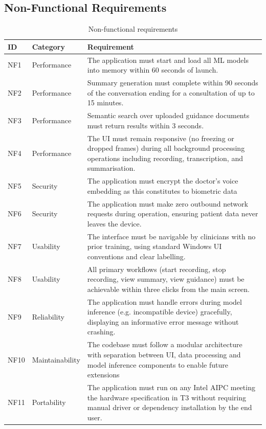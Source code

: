 \subsection{Non-Functional Requirements}
\label{app:nreq}

\begin{table}[H]
\centering
\begin{tabularx}{\textwidth}{l l X}
\toprule
\textbf{ID} & \textbf{Category} & \textbf{Requirement} \\
\midrule
NF1 & Performance & The application must start and load all ML models into memory within 60 seconds of launch. \\
NF2 & Performance & Summary generation must complete within 90 seconds of the conversation ending for a consultation of up to 15 minutes. \\
NF3 & Performance & Semantic search over uploaded guidance documents must return results within 3 seconds. \\
NF4 & Performance & The UI must remain responsive (no freezing or dropped frames) during all background processing operations including recording, transcription, and summarisation. \\
NF5 & Security & The application must encrypt the doctor's voice embedding as this constitutes to biometric data\\
NF6 & Security & The application must make zero outbound network requests during operation, ensuring patient data never leaves the device. \\
NF7 & Usability & The interface must be navigable by clinicians with no prior training, using standard Windows UI conventions and clear labelling. \\
NF8 & Usability & All primary workflows (start recording, stop recording, view summary, view guidance) must be achievable within three clicks from the main screen. \\
NF9 & Reliability & The application must handle errors during model inference (e.g. incompatible device) gracefully, displaying an informative error message without crashing. \\
NF10 & Maintainability & The codebase must follow a modular architecture with separation between UI, data processing and model inference components to enable future extensions\\
NF11 & Portability & The application must run on any Intel AIPC meeting the hardware specification in T3 without requiring manual driver or dependency installation by the end user. \\
\bottomrule
\end{tabularx}
\caption{Non-functional requirements}
\label{tab:nreq}
\end{table}